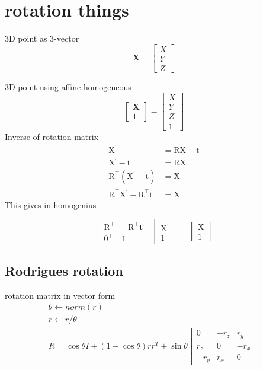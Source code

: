 \documentclass[12pt,a4paper]{article}
\begin{document}
\section{rotation things}
\label{sec-8}


3D point as 3-vector
$$
\mathbf{X}=\left[\begin{array}{l}{X} \\ {Y} \\ {Z}\end{array}\right]
$$

3D point using affine homogeneous
$$
\left[\begin{array}{l}{\mathbf{X}} \\ {1}\end{array}\right]=\left[\begin{array}{l}{X} \\ {Y} \\ {Z} \\ {1}\end{array}\right]
$$
Inverse of rotation matrix
\begin{equation}
\begin{aligned} \mathrm{X}^{\prime} &=\mathrm{RX}+\mathrm{t} \\
 \mathrm{X}^{\prime}-\mathrm{t} &=\mathrm{RX} \\ 
\mathrm{R}^{\top}\left(\mathrm{X}^{\prime}-\mathrm{t}\right) &=\mathrm{X} \\
 \mathrm{R}^{\top} \mathrm{X}^{\prime}-\mathrm{R}^{\top} \mathrm{t} &=\mathrm{X} 
\end{aligned}
\end{equation}
This gives in homogenius

$$
\left[\begin{array}{cc}{\mathrm{R}^{\top}} & {-\mathrm{R}^{\top} \mathbf{t}} \\ {0^{\top}} & {1}\end{array}\right]\left[\begin{array}{l}{\mathrm{X}^{\prime}} \\ {1}\end{array}\right]=\left[\begin{array}{l}{\mathrm{X}} \\ {1}\end{array}\right]
$$
\subsection*{Rodrigues rotation}
\label{sec-8-1}
rotation matrix in vector form
\begin{equation} 
\begin{array}{l} \theta \leftarrow norm(r) \\ r  \leftarrow r/ \theta \\ R =  \cos{\theta} I + (1- \cos{\theta} ) r r^T +  \sin{\theta}\left[\begin{array}{ccc}{0} & {-r_{z}} & {r_{y}} \\ {r_{z}} & {0} & {-r_{x}} \\ {-r_{y}} & {r_{x}} & {0}\end{array}\right] \end{array}
\end{equation}
\end{document}
